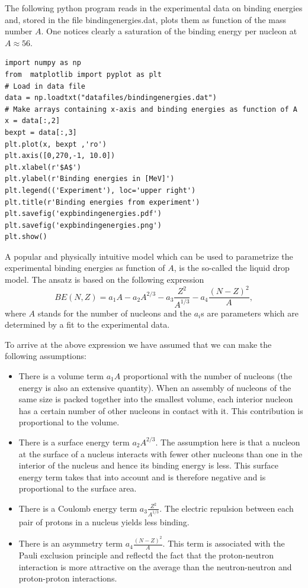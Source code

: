 \documentclass[%
twoside,                 %
final,                   %
10pt]{article}
\begin{document}
The following python program reads in the experimental data on binding energies and, stored in the file bindingenergies.dat,  plots them as function of the mass number $A$. One notices clearly a saturation of the binding energy per nucleon at $A\approx 56$.
\begin{verbatim}
import numpy as np
from  matplotlib import pyplot as plt
# Load in data file
data = np.loadtxt("datafiles/bindingenergies.dat")
# Make arrays containing x-axis and binding energies as function of A
x = data[:,2]
bexpt = data[:,3]
plt.plot(x, bexpt ,'ro')
plt.axis([0,270,-1, 10.0])
plt.xlabel(r'$A$')
plt.ylabel(r'Binding energies in [MeV]')
plt.legend(('Experiment'), loc='upper right')
plt.title(r'Binding energies from experiment')
plt.savefig('expbindingenergies.pdf')
plt.savefig('expbindingenergies.png')
plt.show()
\end{verbatim}

A popular and physically intuitive model which can be used to parametrize 
the experimental binding energies as function of $A$, is the so-called 
the liquid drop model. The ansatz is based on the following expression
\[ 
BE(N,Z) = a_1A-a_2A^{2/3}-a_3\frac{Z^2}{A^{1/3}}-a_4\frac{(N-Z)^2}{A},
\]
where $A$ stands for the number of nucleons and the $a_i$s are parameters which are determined by a fit 
to the experimental data.  

To arrive at the above expression we have assumed that we can make the following assumptions:

\begin{itemize}
 \item There is a volume term $a_1A$ proportional with the number of nucleons (the energy is also an extensive quantity). When an assembly of nucleons of the same size is packed together into the smallest volume, each interior nucleon has a certain number of other nucleons in contact with it. This contribution is proportional to the volume.

 \item There is a surface energy term $a_2A^{2/3}$. The assumption here is that a nucleon at the surface of a nucleus interacts with fewer other nucleons than one in the interior of the nucleus and hence its binding energy is less. This surface energy term takes that into account and is therefore negative and is proportional to the surface area.

 \item There is a Coulomb energy term $a_3\frac{Z^2}{A^{1/3}}$. The electric repulsion between each pair of protons in a nucleus yields less binding. 

 \item There is an asymmetry term $a_4\frac{(N-Z)^2}{A}$. This term is associated with the Pauli exclusion principle and reflectd the fact that the proton-neutron interaction is more attractive on the average than the neutron-neutron and proton-proton interactions.
\end{itemize}
\end{document}
